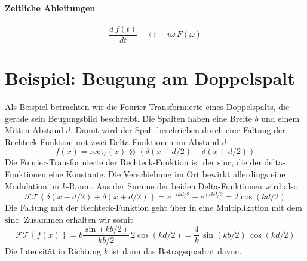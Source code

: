 \paragraph{Zeitliche Ableitungen}
\begin{equation}
 \frac{d \, f(t)}{dt} 
 \quad \leftrightarrow \quad 
i \omega \,  F(\omega) 
\end{equation}



\section{Beispiel: Beugung am Doppelspalt}

Als Beispiel betrachten wir die Fourier-Transformierte eines Doppelspalts, die gerade sein Beugungsbild beschreibt. Die Spalten haben eine Breite $b$ und einem Mitten-Abstand $d$. Damit wird der Spalt beschrieben durch eine Faltung der Rechteck-Funktion mit zwei Delta-Funktionen im Abstand $d$
\begin{equation}
f(x) = \text{rect} _b (x) \, \otimes \, \left( \delta (x - d/2) + \delta (x + d/2) \right)
\end{equation}
Die Fourier-Transformierte der Rechteck-Funktion ist der $\text{sinc}$, die der delta-Funktionen eine Konstante. Die Verschiebung im Ort bewirkt allerdings eine Modulation im $k$-Raum. Aus der Summe der beiden Delta-Funktionen wird also 
\begin{equation}
\mathcal{FT}\left\{ \delta (x - d/2) + \delta (x + d/2)  \right\} =
e^{-i k d/2} + e^{+i k d/2}  = 2 \cos ( k d/2)
\end{equation}
Die Faltung mit der Rechteck-Funktion geht über in eine Multiplikation mit dem $\text{sinc}$. Zusammen erhalten wir somit
\begin{equation}
\mathcal{FT}\left\{ f(x)  \right\} = b \frac{\sin (k b/2) }{kb/2} \, 2 \cos ( k d/2) = \frac{4}{k} \, \sin (k b/2) \,  \cos ( k d/2) 
\end{equation}
Die Intensität in Richtung $k$ ist dann das Betragsquadrat davon.

\printbibliography[segment=\therefsegment,heading=subbibliography]
